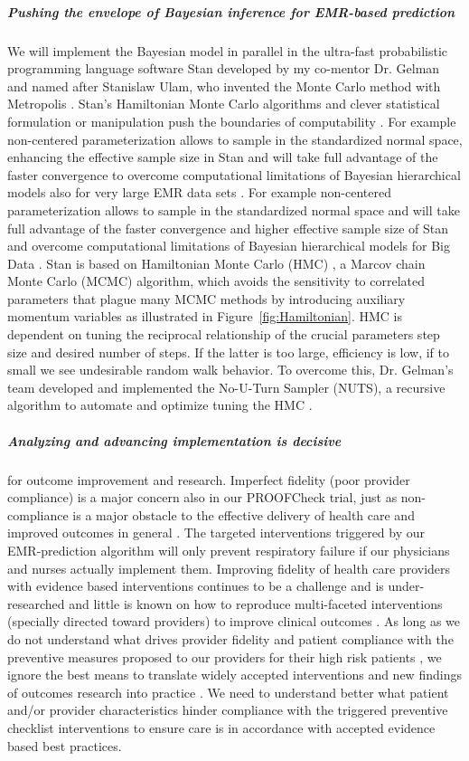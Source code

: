 \documentclass[11pt,notitlepage]{article}
\begin{document}
\subparagraph{Pushing the envelope of Bayesian inference for EMR-based prediction}
We will implement the Bayesian model in parallel in the ultra-fast probabilistic programming language software Stan developed by my co-mentor Dr. Gelman \cite{Stan_Software_2014} and named after Stanislaw
Ulam, who invented the Monte Carlo method with Metropolis \cite{StanislawUlam_1949}. Stan's Hamiltonian Monte Carlo algorithms \cite{Stan_Software_2014} and clever statistical formulation or manipulation push the boundaries of computability \cite{Gelman-Hill_2014}. For example non-centered parameterization allows to sample in the standardized normal space, enhancing the effective sample size in Stan and will take full advantage of the faster convergence to overcome computational limitations of Bayesian hierarchical models also for very large EMR data sets \cite{Gelman-Hill_2014}. For example non-centered parameterization allows to sample in the standardized normal space and will take full advantage of the faster convergence and higher effective sample size of Stan and overcome computational limitations of Bayesian hierarchical models for Big Data \cite{Gelman-Hill_2014}. Stan  is based on Hamiltonian Monte Carlo (HMC) \cite{Gelman-Hill_2014}, a Marcov chain Monte Carlo (MCMC) algorithm, which avoids the sensitivity to correlated parameters that plague many MCMC methods by introducing auxiliary momentum variables \cite{Homan_Gelman_NUTS_2014} as illustrated in Figure~\ref{fig:Hamiltonian}. HMC is dependent  on tuning the reciprocal relationship of the crucial parameters step size and desired number of steps. If the latter is too large, efficiency is low, if to small we see undesirable random walk behavior. To overcome this, Dr. Gelman's team developed and implemented the No-U-Turn Sampler (NUTS), a recursive algorithm to automate and optimize tuning the HMC \cite{Homan_Gelman_NUTS_2014}.
  
\subparagraph*{Analyzing and advancing implementation is decisive} for outcome improvement and research. Imperfect fidelity (poor provider compliance) is a major concern also in our PROOFCheck trial, just as non-compliance is a major obstacle to the effective delivery of health care and improved outcomes in general
\cite{Duncan_16710766}. The targeted interventions triggered by our EMR-prediction algorithm will only prevent respiratory failure if our physicians and nurses actually implement them. Improving fidelity of health care providers with evidence based interventions continues to be a challenge and is under-researched \cite{Davis_7650822} and little is known on how to reproduce multi-faceted interventions (specially directed toward providers) to improve clinical outcomes \cite{Campbell_10987780}. As long as we do not understand what drives provider fidelity and patient compliance with the preventive measures proposed to our providers for their high risk patients  \cite{Mittman_15172904}, we ignore the best means to translate widely accepted interventions and new findings of outcomes research into practice \cite{Glasgow_17150029}. We need to understand better what patient and/or provider characteristics hinder compliance with the triggered preventive checklist interventions to ensure care is in accordance with accepted evidence based best practices.
\end{document}
